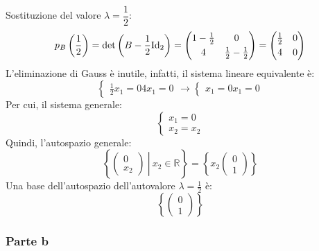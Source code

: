 \documentclass[a4paper]{article}
\makeatletter
\newenvironment{rowequmat}[1]{\left(\array{@{}#1@{}}}{\endarray\right)}
\makeatother
\begin{document}
	\noindent
	Sostituzione del valore $\lambda=\dfrac{1}{2}$:
	\begin{equation*}
		p_{B}\left(\dfrac{1}{2}\right) = \det\left(B - \dfrac{1}{2}\mathrm{Id}_{2}\right) = \begin{rowequmat}{cc}
			1-\frac{1}{2} & 0 \\ [.3em]
			4 & \frac{1}{2} - \frac{1}{2}
		\end{rowequmat} =
		\begin{rowequmat}{cc}
			\frac{1}{2} & 0 \\ [.3em]
			4 & 0
		\end{rowequmat}
	\end{equation*}
	L'eliminazione di Gauss è inutile, infatti, il sistema lineare equivalente è:
	\begin{equation*}
		\begin{cases}
			\frac{1}{2}x_{1} = 0
			4x_{1} = 0
		\end{cases}
		\longrightarrow
		\begin{cases}
			x_{1} = 0
			x_{1} = 0
		\end{cases}
	\end{equation*}
	Per cui, il sistema generale:
	\begin{equation*}
		\begin{cases}
			x_{1} = 0 \\
			x_{2} = x_{2}
		\end{cases}
	\end{equation*}
	Quindi, l'autospazio generale:
	\begin{equation*}
		\left\{
			\left.
			\begin{pmatrix}
				0 \\ x_{2}
			\end{pmatrix} \: \right| \:
			x_{2} \in \mathbb{R}
		\right\} = \left\{
			x_{2} \begin{pmatrix}
				0 \\
				1
			\end{pmatrix}
		\right\}
	\end{equation*}
	Una base dell'autospazio dell'autovalore $\lambda=\frac{1}{2}$ è:
	\begin{equation*}
		\left\{\begin{pmatrix}
			0 \\ 1
		\end{pmatrix}\right\}
	\end{equation*}\newpage

	\subsubsection{Parte b}
\end{document}
